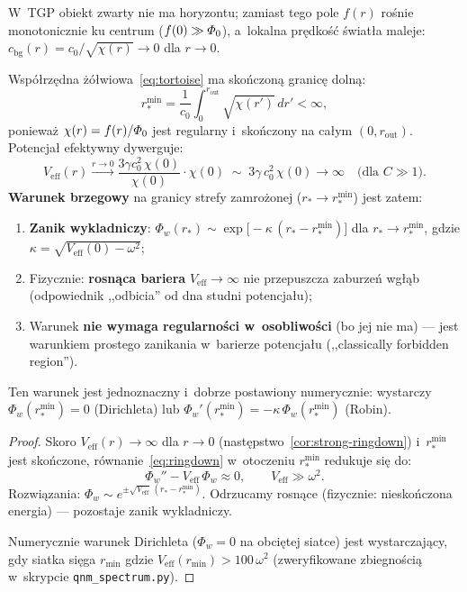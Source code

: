 \begin{proposition}%
\label{prop:frozen-BC}
W~TGP obiekt zwarty nie ma horyzontu; zamiast tego pole $f(r)$
ro\'snie monotonicznie ku centrum ($f(0) \gg \varPhi_0$),
a~lokalna pr\k{e}dko\'s\'c \'swiat\l{}a maleje:
$c_{\mathrm{bg}}(r) = c_0/\sqrt{\chi(r)} \to 0$ dla $r \to 0$.

Wsp\'o\l{}rz\k{e}dna \.z\'o\l{}wiowa~\eqref{eq:tortoise} ma
sko\'nczon\k{a} granic\k{e} doln\k{a}:
\begin{equation}\label{eq:rstar-min}
  r_*^{\min} = \frac{1}{c_0}\int_0^{r_{\mathrm{out}}}
  \sqrt{\chi(r')}\,dr' < \infty,
\end{equation}
poniewa\.z $\chi(r) = f(r)/\varPhi_0$ jest regularny i~sko\'nczony
na ca\l{}ym $(0, r_{\mathrm{out}})$. Potencja\l{} efektywny dywerguje:
\begin{equation}\label{eq:Veff-frozen}
  V_{\mathrm{eff}}(r) \xrightarrow{r \to 0}
  \frac{3\gamma c_0^2\,\chi(0)}{\chi(0)} \cdot \chi(0)
  \;\sim\; 3\gamma\,c_0^2\,\chi(0) \to \infty
  \quad\text{(dla $C \gg 1$)}.
\end{equation}
\textbf{Warunek brzegowy} na granicy strefy zamro\.zonej ($r_* \to r_*^{\min}$)
jest zatem:
\begin{enumerate}[nosep]
  \item \textbf{Zanik wykl{}adniczy}: $\Phi_w(r_*) \sim
    \exp\!\bigl[-\kappa\,(r_* - r_*^{\min})\bigr]$ dla $r_* \to r_*^{\min}$,
    gdzie $\kappa = \sqrt{V_{\mathrm{eff}}(0) - \omega^2}$;
  \item Fizycznie: \textbf{rosn\k{a}ca bariera} $V_{\mathrm{eff}} \to \infty$
    nie przepuszcza zaburze\'n wg\l{}\k{a}b (odpowiednik ,,odbicia''
    od dna studni potencja\l{}u);
  \item Warunek \textbf{nie wymaga regularno\'sci w~osobliwo\'sci}
    (bo jej nie ma) --- jest warunkiem prostego zanikania
    w~barierze potencja\l{}u (,,classically forbidden region'').
\end{enumerate}
Ten warunek jest jednoznaczny i~dobrze postawiony numerycznie:
wystarczy $\Phi_w(r_*^{\min}) = 0$ (Dirichleta) lub
$\Phi_w'(r_*^{\min}) = -\kappa\,\Phi_w(r_*^{\min})$ (Robin).
\end{proposition}

\begin{proof}
Skoro $V_{\mathrm{eff}}(r) \to \infty$ dla $r \to 0$
(nast\k{e}pstwo~\ref{cor:strong-ringdown}) i~$r_*^{\min}$ jest
sko\'nczone, r\'ownanie~\eqref{eq:ringdown} w~otoczeniu
$r_*^{\min}$ redukuje si\k{e} do:
\[
  \Phi_w'' - V_{\mathrm{eff}}\,\Phi_w \approx 0,
  \qquad V_{\mathrm{eff}} \gg \omega^2.
\]
Rozwi\k{a}zania: $\Phi_w \sim e^{\pm\sqrt{V_{\mathrm{eff}}}\,(r_* - r_*^{\min})}$.
Odrzucamy rosn\k{a}ce (fizycznie: niesko\'nczona energia)
--- pozostaje zanik wykl{}adniczy.

Numerycznie warunek Dirichleta ($\Phi_w = 0$ na obci\k{e}tej
siatce) jest wystarczaj\k{a}cy, gdy siatka si\k{e}ga
$r_{\min}$ gdzie $V_{\mathrm{eff}}(r_{\min}) > 100\,\omega^2$
(zweryfikowane zbiegno\'sci\k{a} w~skrypcie \texttt{qnm\_spectrum.py}).
\end{proof}

